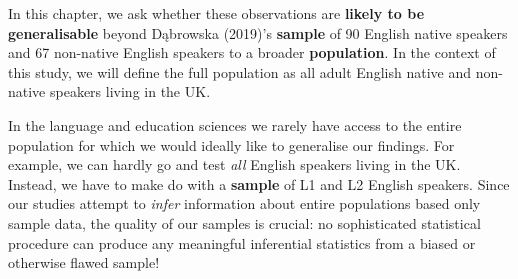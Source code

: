 \documentclass[
  letterpaper,
  DIV=11,
  numbers=noendperiod]{scrreprt}
\begin{document}
In this chapter, we ask whether these observations are \textbf{likely to
be generalisable} beyond Dąbrowska (2019)'s \textbf{sample} of 90
English native speakers and 67 non-native English speakers to a broader
\textbf{population}. In the context of this study, we will define the
full population as all adult English native and non-native speakers
living in the UK.

In the language and education sciences we rarely have access to the
entire population for which we would ideally like to generalise our
findings. For example, we can hardly go and test \emph{all} English
speakers living in the UK. Instead, we have to make do with a
\textbf{sample} of L1 and L2 English speakers. Since our studies attempt
to \emph{infer} information about entire populations based only sample
data, the quality of our samples is crucial: no sophisticated
statistical procedure can produce any meaningful inferential statistics
from a biased or otherwise flawed sample!
\end{document}
